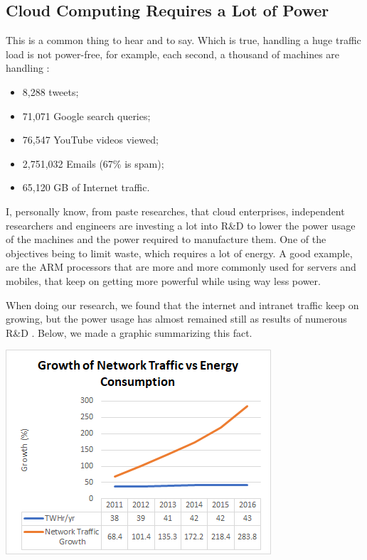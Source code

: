 \documentclass[final, a4paper, 9.5pt]{article}
\newenvironment{Figure}
  {\par\medskip\noindent\minipage{\linewidth}}
  {\endminipage\par\medskip}
\begin{document}
\begin{multicols}{2}

\section*{Cloud Computing Requires a Lot of Power}
This is a common thing to hear and to say. Which is true, handling a huge traffic load is not power-free, for example, each second, a thousand of machines are handling \cite{google_searches}:
\begin{itemize}
    \item 8,288 tweets;
    \item 71,071 Google search queries;
    \item 76,547 YouTube videos viewed;
    \item 2,751,032 Emails (67\% is spam);
    \item 65,120 GB of Internet traffic.
\end{itemize}

I, personally know, from paste researches, that cloud enterprises, independent researchers and engineers are investing a lot into R\&D to lower the power usage of the machines and the power required to manufacture them. One of the objectives being to limit waste, which requires a lot of energy. A good example, are the ARM processors that are more and more commonly used for servers and mobiles, that keep on getting more powerful while using way less power.

When doing our research, we found that the internet and intranet traffic keep on growing, but the power usage has almost remained still as results of numerous R\&D \cite{traffic_growth}. Below, we made a graphic summarizing this fact.
\begin{Figure}
    \centering
    \includegraphics[width=\linewidth]{figures/cloudgrowth.png}
\end{Figure}


\end{multicols}
\end{document}
